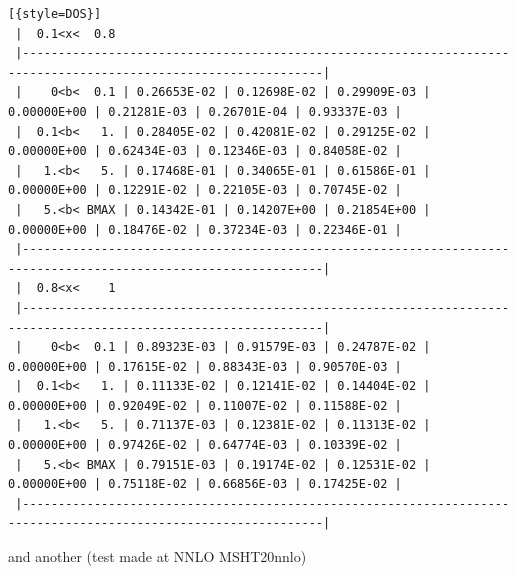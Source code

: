 \documentclass[prd,nofootinbib,eqsecnum,final]{revtex4}
\renewcommand{\(}{\left(}
\renewcommand{\)}{\right)}
\renewcommand{\[}{\left[}
\renewcommand{\]}{\right]}
\begin{document}
\begin{lstlisting}[{style=DOS}]
 |  0.1<x<  0.8
 |----------------------------------------------------------------------------------------------------------------|
 |    0<b<  0.1 | 0.26653E-02 | 0.12698E-02 | 0.29909E-03 | 0.00000E+00 | 0.21281E-03 | 0.26701E-04 | 0.93337E-03 |
 |  0.1<b<   1. | 0.28405E-02 | 0.42081E-02 | 0.29125E-02 | 0.00000E+00 | 0.62434E-03 | 0.12346E-03 | 0.84058E-02 |
 |   1.<b<   5. | 0.17468E-01 | 0.34065E-01 | 0.61586E-01 | 0.00000E+00 | 0.12291E-02 | 0.22105E-03 | 0.70745E-02 |
 |   5.<b< BMAX | 0.14342E-01 | 0.14207E+00 | 0.21854E+00 | 0.00000E+00 | 0.18476E-02 | 0.37234E-03 | 0.22346E-01 |
 |----------------------------------------------------------------------------------------------------------------|
 |  0.8<x<    1
 |----------------------------------------------------------------------------------------------------------------|
 |    0<b<  0.1 | 0.89323E-03 | 0.91579E-03 | 0.24787E-02 | 0.00000E+00 | 0.17615E-02 | 0.88343E-03 | 0.90570E-03 |
 |  0.1<b<   1. | 0.11133E-02 | 0.12141E-02 | 0.14404E-02 | 0.00000E+00 | 0.92049E-02 | 0.11007E-02 | 0.11588E-02 |
 |   1.<b<   5. | 0.71137E-03 | 0.12381E-02 | 0.11313E-02 | 0.00000E+00 | 0.97426E-02 | 0.64774E-03 | 0.10339E-02 |
 |   5.<b< BMAX | 0.79151E-03 | 0.19174E-02 | 0.12531E-02 | 0.00000E+00 | 0.75118E-02 | 0.66856E-03 | 0.17425E-02 |
 |----------------------------------------------------------------------------------------------------------------|
\end{lstlisting}
and another (test made at NNLO MSHT20nnlo)
\end{document}
